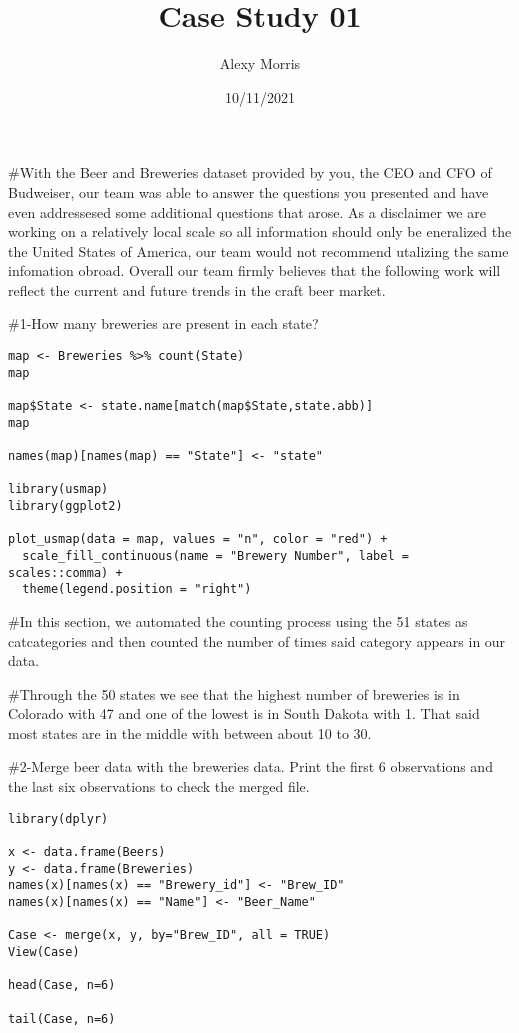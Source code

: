 \documentclass[
]{article}
\title{Case Study 01}
\author{Alexy Morris}
\date{10/11/2021}
\begin{document}
\maketitle

\#With the Beer and Breweries dataset provided by you, the CEO and CFO
of Budweiser, our team was able to answer the questions you presented
and have even addressesed some additional questions that arose. As a
disclaimer we are working on a relatively local scale so all information
should only be eneralized the the United States of America, our team
would not recommend utalizing the same infomation obroad. Overall our
team firmly believes that the following work will reflect the current
and future trends in the craft beer market.

\#1-How many breweries are present in each state?

\begin{verbatim}
map <- Breweries %>% count(State)
map

map$State <- state.name[match(map$State,state.abb)]
map 

names(map)[names(map) == "State"] <- "state"

library(usmap)
library(ggplot2)

plot_usmap(data = map, values = "n", color = "red") + 
  scale_fill_continuous(name = "Brewery Number", label = scales::comma) + 
  theme(legend.position = "right")
\end{verbatim}

\#In this section, we automated the counting process using the 51 states
as catcategories and then counted the number of times said category
appears in our data.

\#Through the 50 states we see that the highest number of breweries is
in Colorado with 47 and one of the lowest is in South Dakota with 1.
That said most states are in the middle with between about 10 to 30.

\#2-Merge beer data with the breweries data. Print the first 6
observations and the last six observations to check the merged file.

\begin{verbatim}
library(dplyr)

x <- data.frame(Beers)
y <- data.frame(Breweries)
names(x)[names(x) == "Brewery_id"] <- "Brew_ID"
names(x)[names(x) == "Name"] <- "Beer_Name"

Case <- merge(x, y, by="Brew_ID", all = TRUE)
View(Case)

head(Case, n=6)

tail(Case, n=6)
\end{verbatim}
\end{document}
